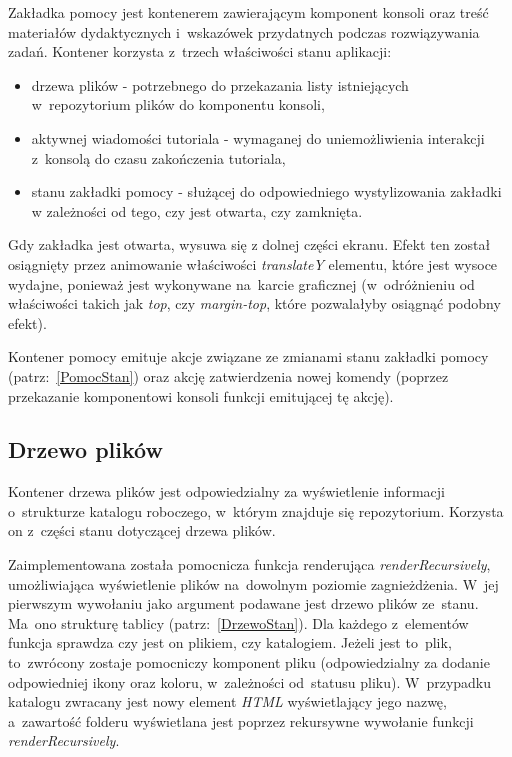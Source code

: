 \documentclass[12pt,a4paper,polish,thesis]{dcsbook}
\begin{document}
{	Zakładka pomocy jest kontenerem zawierającym komponent konsoli oraz treść materiałów dydaktycznych i~wskazówek przydatnych podczas rozwiązywania zadań. Kontener korzysta z~trzech właściwości stanu aplikacji:
	\begin{itemize}
		\item drzewa plików - potrzebnego do przekazania listy istniejących w~repozytorium plików do komponentu konsoli,
		\item aktywnej wiadomości tutoriala - wymaganej do uniemożliwienia interakcji z~konsolą do czasu zakończenia tutoriala,
		\item stanu zakładki pomocy - służącej do odpowiedniego wystylizowania zakładki w zależności od tego, czy jest otwarta, czy zamknięta.
	\end{itemize}
	  Gdy zakładka jest otwarta, wysuwa się z dolnej części ekranu. Efekt ten został osiągnięty przez animowanie właściwości \textit{translateY} elementu, które jest wysoce wydajne, ponieważ jest wykonywane na~karcie graficznej (w~odróżnieniu od właściwości takich jak \textit{top}, czy \textit{margin-top}, które pozwalałyby osiągnąć podobny efekt). 

	  Kontener pomocy emituje akcje związane ze zmianami stanu zakładki pomocy (patrz:~\ref{PomocStan}) oraz akcję zatwierdzenia nowej komendy (poprzez przekazanie komponentowi konsoli funkcji emitującej tę akcję).

	\subsection{Drzewo plików}

	Kontener drzewa plików jest odpowiedzialny za wyświetlenie informacji o~strukturze katalogu roboczego, w~którym znajduje się repozytorium. Korzysta on z~części stanu dotyczącej drzewa plików.

	Zaimplementowana została pomocnicza funkcja renderująca \textit{renderRecursively}, umożliwiająca wyświetlenie plików na~dowolnym poziomie zagnieżdżenia. W~jej pierwszym wywołaniu jako argument podawane jest drzewo plików ze~stanu. Ma~ono strukturę tablicy (patrz:~\ref{DrzewoStan}). Dla każdego z~elementów funkcja sprawdza czy jest on plikiem, czy katalogiem. Jeżeli jest to~plik, to~zwrócony zostaje pomocniczy komponent pliku (odpowiedzialny za dodanie odpowiedniej ikony oraz koloru, w~zależności od~statusu pliku). W~przypadku katalogu zwracany jest nowy element \textit{HTML} wyświetlający jego nazwę, a~zawartość folderu wyświetlana jest poprzez rekursywne wywołanie funkcji \textit{renderRecursively}.

}
\end{document}
